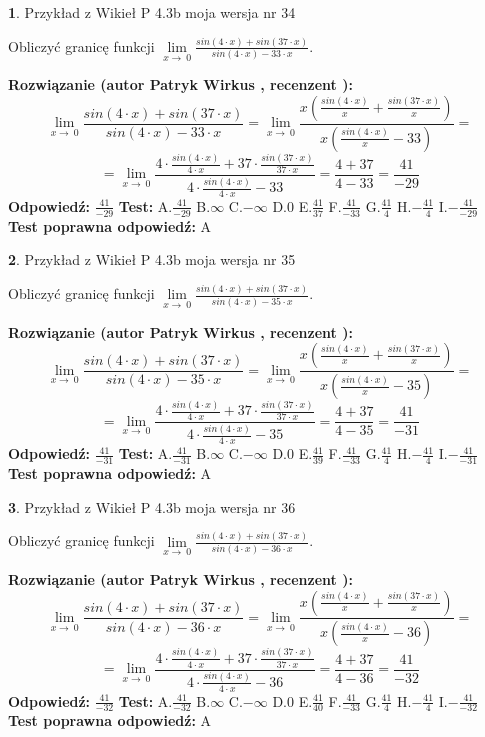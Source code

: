 \documentclass[12pt, a4paper]{article}
\theoremstyle{definition} %
\newtheorem{zad}{}
\newcommand{\zadStart}[1]{\begin{zad}#1\newline}
\newcommand{\zadStop}{\end{zad}}
\newcommand{\rozwStart}[2]{\noindent \textbf{Rozwiązanie (autor #1 , recenzent #2): }\newline}
\newcommand{\rozwStop}{\newline}
\newcommand{\odpStart}{\noindent \textbf{Odpowiedź:}\newline}
\newcommand{\odpStop}{\newline}
\newcommand{\testStart}{\noindent \textbf{Test:}\newline}
\newcommand{\testStop}{\newline}
\newcommand{\kluczStart}{\noindent \textbf{Test poprawna odpowiedź:}\newline}
\newcommand{\kluczStop}{\newline}
\begin{document}
\zadStart{Przykład z Wikieł P 4.3b moja wersja nr 34}


Obliczyć granicę funkcji $\lim\limits_{x\to\ 0}\frac{sin(4 \cdot x)+sin(37 \cdot x)}{sin(4 \cdot x)-33 \cdot x}$.
\zadStop
\rozwStart{Patryk Wirkus}{}
$$\lim\limits_{x\to\ 0}\frac{sin(4 \cdot x)+sin(37 \cdot x)}{sin(4 \cdot x)-33 \cdot x}=\lim\limits_{x\to\ 0}\frac{x(\frac{sin(4 \cdot x)}{x}+\frac{sin(37 \cdot x)}{x})}{x(\frac{sin(4 \cdot x)}{x}-33)}=$$
$$=\lim\limits_{x\to\ 0}\frac{4 \cdot \frac{sin(4 \cdot x)}{4 \cdot x}+37 \cdot \frac{sin(37 \cdot x)}{37 \cdot x}}{4 \cdot \frac{sin(4 \cdot x)}{4 \cdot x}-33}=\frac{4+37}{4-33} = \frac{41}{-29}$$
\rozwStop
\odpStart
$\frac{41}{-29}$
\odpStop
\testStart
A.$\frac{41}{-29}$
B.$\infty$
C.$-\infty$
D.$0$
E.$\frac{41}{37}$
F.$\frac{41}{-33}$
G.$\frac{41}{4}$
H.$-\frac{41}{4}$
I.$-\frac{41}{-29}$
\testStop
\kluczStart
A
\kluczStop



\zadStart{Przykład z Wikieł P 4.3b moja wersja nr 35}


Obliczyć granicę funkcji $\lim\limits_{x\to\ 0}\frac{sin(4 \cdot x)+sin(37 \cdot x)}{sin(4 \cdot x)-35 \cdot x}$.
\zadStop
\rozwStart{Patryk Wirkus}{}
$$\lim\limits_{x\to\ 0}\frac{sin(4 \cdot x)+sin(37 \cdot x)}{sin(4 \cdot x)-35 \cdot x}=\lim\limits_{x\to\ 0}\frac{x(\frac{sin(4 \cdot x)}{x}+\frac{sin(37 \cdot x)}{x})}{x(\frac{sin(4 \cdot x)}{x}-35)}=$$
$$=\lim\limits_{x\to\ 0}\frac{4 \cdot \frac{sin(4 \cdot x)}{4 \cdot x}+37 \cdot \frac{sin(37 \cdot x)}{37 \cdot x}}{4 \cdot \frac{sin(4 \cdot x)}{4 \cdot x}-35}=\frac{4+37}{4-35} = \frac{41}{-31}$$
\rozwStop
\odpStart
$\frac{41}{-31}$
\odpStop
\testStart
A.$\frac{41}{-31}$
B.$\infty$
C.$-\infty$
D.$0$
E.$\frac{41}{39}$
F.$\frac{41}{-33}$
G.$\frac{41}{4}$
H.$-\frac{41}{4}$
I.$-\frac{41}{-31}$
\testStop
\kluczStart
A
\kluczStop



\zadStart{Przykład z Wikieł P 4.3b moja wersja nr 36}


Obliczyć granicę funkcji $\lim\limits_{x\to\ 0}\frac{sin(4 \cdot x)+sin(37 \cdot x)}{sin(4 \cdot x)-36 \cdot x}$.
\zadStop
\rozwStart{Patryk Wirkus}{}
$$\lim\limits_{x\to\ 0}\frac{sin(4 \cdot x)+sin(37 \cdot x)}{sin(4 \cdot x)-36 \cdot x}=\lim\limits_{x\to\ 0}\frac{x(\frac{sin(4 \cdot x)}{x}+\frac{sin(37 \cdot x)}{x})}{x(\frac{sin(4 \cdot x)}{x}-36)}=$$
$$=\lim\limits_{x\to\ 0}\frac{4 \cdot \frac{sin(4 \cdot x)}{4 \cdot x}+37 \cdot \frac{sin(37 \cdot x)}{37 \cdot x}}{4 \cdot \frac{sin(4 \cdot x)}{4 \cdot x}-36}=\frac{4+37}{4-36} = \frac{41}{-32}$$
\rozwStop
\odpStart
$\frac{41}{-32}$
\odpStop
\testStart
A.$\frac{41}{-32}$
B.$\infty$
C.$-\infty$
D.$0$
E.$\frac{41}{40}$
F.$\frac{41}{-33}$
G.$\frac{41}{4}$
H.$-\frac{41}{4}$
I.$-\frac{41}{-32}$
\testStop
\kluczStart
A
\kluczStop
\end{document}
